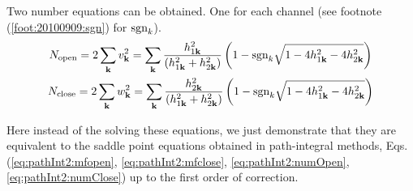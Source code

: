Two number equations can be obtained.  One for each channel (see footnote (\ref{foot:20100909:sgn}) for $\text{sgn}_{k}$).
\begin{gather}\label{eq:20100909:number}
N_{\text{open}}=2\sum_{\mathbf{k}}v_{\mathbf{k}}^{2}
	=\sum_{\mathbf{k}}\frac{ h_{1\mathbf{k}}^2}{( h_{1\mathbf{k}}^2+ h_{2\mathbf{k}}^2)} \left(1-\text{sgn}_{k}\sqrt{1-4 h_{1\mathbf{k}}^2-4 h_{2\mathbf{k}}^2}\right)\\
N_{\text{close}}=2\sum_{\mathbf{k}}w_{\mathbf{k}}^{2}
	=\sum_{\mathbf{k}}\frac{ h_{2\mathbf{k}}^2}{( h_{1\mathbf{k}}^2+ h_{2\mathbf{k}}^2)} \left(1-\text{sgn}_{k}\sqrt{1-4 h_{1\mathbf{k}}^2-4 h_{2\mathbf{k}}^2}\right)
\end{gather} 



Here instead of the solving these equations, we just demonstrate that they are equivalent to the saddle point equations obtained in path-integral methods, Eqs. (\ref{eq:pathInt2:mfopen}, \ref{eq:pathInt2:mfclose}, \ref{eq:pathInt2:numOpen}, \ref{eq:pathInt2:numClose}) up to the first order of correction.












































